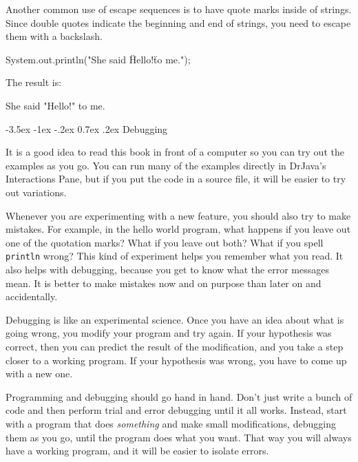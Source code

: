 \documentclass[12pt]{book}
\makeatletter
\theoremstyle{exercise}
\newcommand{\java}[1]{\verb"#1"}
\renewcommand{\section}{\@startsection{section}{1}{\z@}%
    {-3.5ex \@plus -1ex \@minus -.2ex}%
    {0.7ex \@plus.2ex}%
    {\normalfont\Large\bfseries}}
\newcommand{\java}[1]{\lstinline{#1}} %
\makeatother
\begin{document}
Another common use of escape sequences is to have quote marks inside of strings.
Since double quotes indicate the beginning and end of strings, you need to escape them with a backslash.

\begin{code}
    System.out.println("She said \"Hello!\" to me.");
\end{code}

The result is:

\begin{stdout}
She said "Hello!" to me.
\end{stdout}


\section{Debugging}
\label{sec:examples}

It is a good idea to read this book in front of a computer so you can try out the examples as you go.
You can run many of the examples directly in DrJava's Interactions Pane, but if you put the code in a source file, it will be easier to try out variations.

Whenever you are experimenting with a new feature, you should also try to make mistakes.
For example, in the hello world program, what happens if you leave out one of the quotation marks?
What if you leave out both?
What if you spell \java{println} wrong?
This kind of experiment helps you remember what you read.
It also helps with debugging, because you get to know what the error messages mean.
It is better to make mistakes now and on purpose than later on and accidentally.



Debugging is like an experimental science.
Once you have an idea about what is going wrong, you modify your program and try again.
If your hypothesis was correct, then you can predict the result of the modification, and you take a step closer to a working program.
If your hypothesis was wrong, you have to come up with a new one.

Programming and debugging should go hand in hand.
Don't just write a bunch of code and then perform trial and error debugging until it all works.
Instead, start with a program that does {\em something} and make small modifications, debugging them as you go, until the program does what you want.
That way you will always have a working program, and it will be easier to isolate errors.
\end{document}
